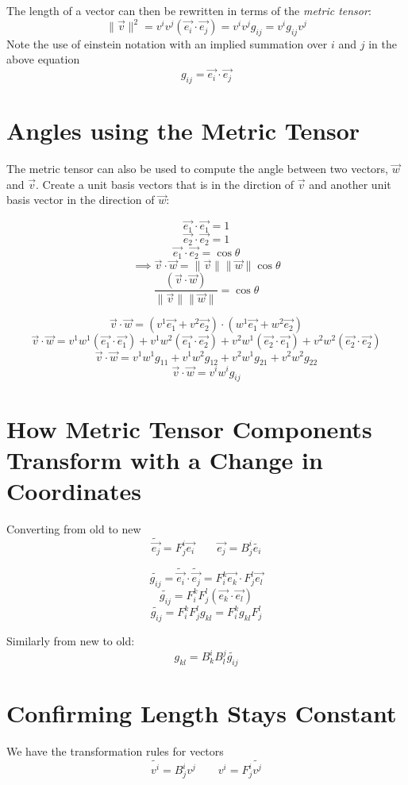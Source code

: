 \documentclass{report}
\begin{document}
The length of a vector can then be rewritten in terms of the \emph{metric tensor}:
$$ \|\vec{v}\|^2 = v^i v^j \left( \vec{e_i}\cdot \vec{e_j} \right)  = v^i v^j g_{ij} = v^i g_{ij} v^j $$ 
Note the use of einstein notation with an implied summation over $i$ and $j$ in the above equation
$$ g_{ij} = \vec{e_i} \cdot \vec{e_j} $$ 

\section{Angles using the Metric Tensor}
The metric tensor can also be used to compute the angle between two vectors, $\vec{w}$ and $\vec{v}$. Create a unit basis vectors that is in the dirction of $\vec{v}$ and another unit basis vector in the direction of $\vec{w}$:

$$ \vec{e_1} \cdot \vec{e_1 } = 1 $$ 
$$ \vec{e_2} \cdot \vec{e_2 } = 1 $$ 
$$ \vec{e_1} \cdot \vec{e_2} = \cos \theta $$ 
$$ \implies \vec{v} \cdot \vec{w} = \|\vec{v}\| \|\vec{w}\| \cos \theta $$ 
$$ \frac{\left( \vec{v} \cdot \vec{w} \right) }{\|\vec{v}\|\|\vec{w}\|} = \cos \theta $$ 

$$ \vec{v}\cdot \vec{w} = \left( v^1 \vec{e_1} + v^2 \vec{e_2} \right) \cdot \left( w^1 \vec{e_1} + w^2 \vec{e_2} \right) $$ 
$$ \vec{v} \cdot \vec{w}= v^1 w^1 \left( \vec{e_1} \cdot \vec{e_1} \right) + v^1 w^2 \left( \vec{e_1} \cdot \vec{e_2} \right) + v^2 w^1 \left( \vec{e_2} \cdot \vec{e_1} \right)   + v^2 w^2 \left( \vec{e_2}\cdot \vec{e_2} \right) $$ 
$$ \vec{v}\cdot \vec{w} = v^1 w^1 g_{11} + v^1 w^2 g_{12} + v^2 w^1 g_{21} + v^2 w^2 g_{22} $$ 
$$ \vec{v}\cdot \vec{w} = v^i w^i g_{ij} $$ 

\section{How Metric Tensor Components Transform with a Change in Coordinates}
Converting from old to new
$$ \widetilde{\vec{e_j}} = F_j^i \vec{e_i}  \qquad \vec{e_j} = B_j^i \widetilde{e_i} $$ 

$$ \widetilde{g_{ij}} = \widetilde{\vec{e_i}} \cdot \widetilde{\vec{e_j}} = F_i^k \vec{e_k} \cdot F_j^l \vec{e_l}$$
$$ \widetilde{g_{ij}} = F_i^k F_j^l \left( \vec{e_k} \cdot \vec{e_l} \right)  $$ 
$$ \widetilde{g_{ij}} = F_i^k F_j^l g_{kl} = F_i^k g_{kl} F_j^l $$ 

Similarly from new to old:
$$ g_{kl} = B_k^i B_l^j \widetilde{g_{ij}}  $$ 

\section{Confirming Length Stays Constant}
We have the transformation rules for vectors
$$ \widetilde{v^i} = B_j^i v^j \qquad v^i = F_j^i \widetilde{v^j} $$ 
\end{document}
